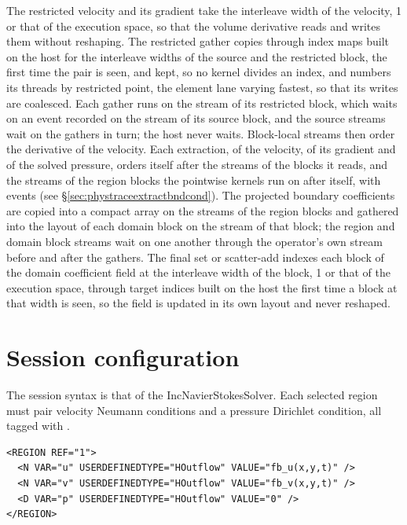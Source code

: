 The restricted velocity and its gradient take the interleave width of the
velocity, 1 or that of the execution space, so that the volume derivative
reads and writes them without reshaping. The restricted gather copies through
index maps built on the host for the interleave widths of the source and the
restricted block, the first time the pair is seen, and kept, so no kernel
divides an index, and numbers its threads by restricted point, the element
lane varying fastest, so that its writes are coalesced. Each gather runs on
the stream of its restricted block,
which waits on an event recorded on the stream of its source block, and the
source streams wait on the gathers in turn; the host never waits. Block-local
streams then order the derivative of the velocity. Each extraction, of the
velocity, of its gradient and of the solved pressure, orders itself after
the streams of the blocks it reads, and
the streams of the region blocks the pointwise kernels run on after itself,
with events (see \S\ref{sec:phystraceextractbndcond}). The projected boundary
coefficients are copied into a compact array on the streams of the region
blocks and gathered into the layout of each domain block on the stream of
that block; the region and domain block streams wait on one another through
the operator's own stream before and after the gathers. The final set or
scatter-add indexes each block of the domain coefficient field at the
interleave width of the block, 1 or that of the execution space, through
target indices built on the host the first time a block at that width is
seen, so the field is updated in its own layout and never reshaped.

\FloatBarrier
\section{Session configuration}

The session syntax is that of the IncNavierStokesSolver.  Each selected
region must pair velocity
Neumann conditions and a pressure Dirichlet condition, all tagged with
.

\begin{lstlisting}[style=XMLStyle,caption={Minimal two-dimensional HOutflow region.}]
<REGION REF="1">
  <N VAR="u" USERDEFINEDTYPE="HOutflow" VALUE="fb_u(x,y,t)" />
  <N VAR="v" USERDEFINEDTYPE="HOutflow" VALUE="fb_v(x,y,t)" />
  <D VAR="p" USERDEFINEDTYPE="HOutflow" VALUE="0" />
</REGION>
\end{lstlisting}


